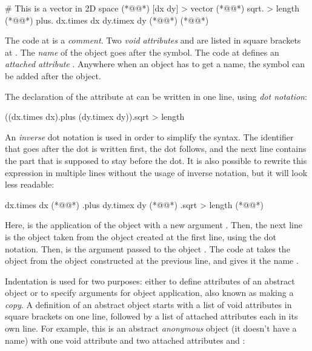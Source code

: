 {\lstset{showspaces=true}\begin{ffcode}
# This is a vector in 2D space (*@\label{ln:comment}@*)
[dx dy] > vector (*@\label{ln:vector}@*)
  sqrt. > length (*@\label{ln:length}@*)
    plus.
      dx.times dx
      dy.timex dy (*@\label{ln:length-end}@*) (*@\label{ln:vector-end}@*)
\end{ffcode}
}

The code at  is a \emph{comment}.
Two \emph{void attributes}  and 
are listed in square brackets at .
The \emph{name} of the object goes after the \ff{>} symbol.
The code at  defines
an \emph{attached attribute} . Anywhere when an object
has to get a name, the \ff{>} symbol can be added after the object.

The declaration of the attribute  at 
can be written in one line, using \emph{dot notation}:

\begin{ffcode}
((dx.times dx).plus (dy.timex dy)).sqrt > length
\end{ffcode}

An \emph{inverse} dot notation is used in order to simplify
the syntax. The identifier that goes after the dot is written
first, the dot follows, and the next line contains the part
that is supposed to stay before the dot. It is also possible to rewrite
this expression in multiple lines without the usage of
inverse notation, but it will look less readable:

\begin{ffcode}
dx.times dx (*@\label{ln:dx-pow}@*)
.plus
  dy.timex dy (*@\label{ln:dx-pow-2}@*)
.sqrt > length (*@\label{ln:dx-pow-3}@*)
\end{ffcode}

Here,  is the application of the object  with
a new argument . Then, the next line is the object  taken
from the object created at the first line, using the dot notation. Then,
 is the argument passed to the object .
The code at  takes the object  from the object constructed
at the previous line, and gives it the name .

Indentation is used for two purposes: either to define attributes
of an abstract object or to specify arguments for object application, also
known as making a \emph{copy}.
A definition of an abstract object starts with a list of void attributes
in square brackets on one line, followed by a list of attached attributes
each in its own line. For example, this is an abstract \emph{anonymous} object
(it doesn't have a name)
with one void attribute  and two attached attributes  and :

